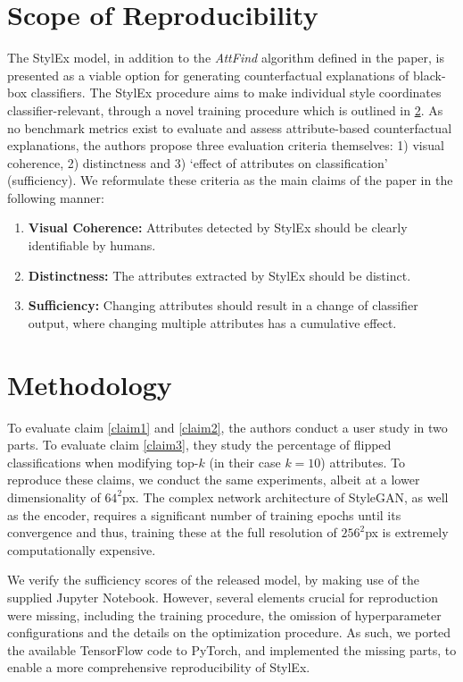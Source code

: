 \section{Scope of Reproducibility}

The StylEx model, in addition to the \textit{AttFind} algorithm defined in the paper, is presented as a viable option for generating counterfactual explanations of black-box classifiers. The StylEx procedure aims to make individual style coordinates classifier-relevant, through a novel training procedure which is outlined in \ref{methodology}. As no benchmark metrics exist to evaluate and assess attribute-based counterfactual explanations, the authors propose three evaluation criteria themselves: 1) visual coherence, 2) distinctness and 3) `effect of attributes on classification' (sufficiency). We reformulate these criteria as the main claims of the paper in the following manner: 

\begin{enumerate}
    \item \label{claim1}\textbf{Visual Coherence:} Attributes detected by StylEx should be clearly identifiable by humans.
    \item \label{claim2}\textbf{Distinctness:} The attributes extracted by StylEx should be distinct.
    \item \label{claim3}\textbf{Sufficiency:} Changing attributes should result in a change of classifier output, where changing multiple attributes has a cumulative effect.
\end{enumerate}

\section{Methodology}
\label{methodology}

To evaluate claim \ref{claim1} and \ref{claim2}, the authors conduct a user study in two parts. To evaluate claim \ref{claim3}, they study the percentage of flipped classifications when modifying top-$k$ (in their case $k=10$) attributes. To reproduce these claims, we conduct the same experiments, albeit at a lower dimensionality of $64^2$px. The complex network architecture of StyleGAN, as well as the encoder, requires a significant number of training epochs until its convergence and thus, training these at the full resolution of $256^2$px is extremely computationally expensive.

We verify the sufficiency scores of the released model, by making use of the supplied Jupyter Notebook. However, several elements crucial for reproduction were missing, including the training procedure, the omission of hyperparameter configurations and the details on the optimization procedure. As such, we ported the available TensorFlow code to PyTorch, and implemented the missing parts, to enable a more comprehensive reproducibility of StylEx.

